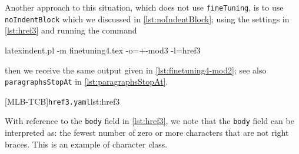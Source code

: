 \begin{example}
	 Another approach to this situation, which does not use \texttt{fineTuning}, is to use \texttt{noIndentBlock}
	 which we discussed in \vref{lst:noIndentBlock};
	 using the settings in \cref{lst:href3} and running the command
	 \begin{commandshell}
latexindent.pl -m finetuning4.tex -o=+-mod3 -l=href3
\end{commandshell}
	 then we receive the same output given in \cref{lst:finetuning4-mod2}; see also \texttt{paragraphsStopAt}
	 in \vref{lst:paragraphsStopAt}.

	 [MLB-TCB]{\texttt{href3.yaml}}{lst:href3}

	 With reference to the \texttt{body} field in \cref{lst:href3}, we note that the \texttt{body} field can
	 be interpreted as: the fewest number of zero or more characters that are not right braces. This
	 is an example of character class.
 \end{example}

